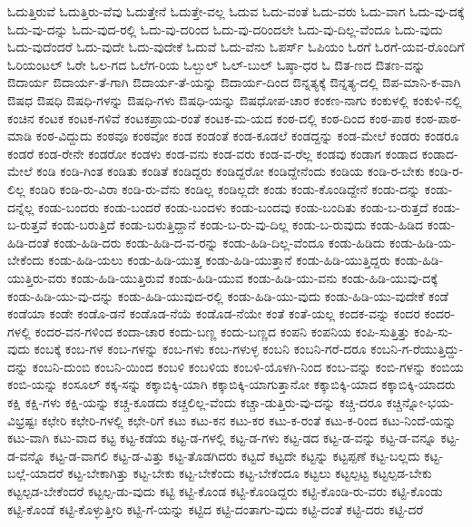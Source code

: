{ಓದುತ್ತಿರುವೆ
ಓದುತ್ತಿರು-ವೆವು
ಓದುತ್ತೇನೆ
ಓದುತ್ತೇ-ವಲ್ಲ
ಓದುವ
ಓದು-ವಂತೆ
ಓದು-ವರು
ಓದು-ವಾಗ
ಓದು-ವು-ದಕ್ಕೆ
ಓದು-ವು-ದನ್ನು
ಓದು-ವುದ-ರಲ್ಲಿ
ಓದು-ವು-ದರಿಂದ
ಓದು-ವು-ದರಿಂದಲೇ
ಓದು-ವು-ದಿಲ್ಲ-ವೆಂದೂ
ಓದು-ವುದು
ಓದು-ವುದೆಂದರೆ
ಓದು-ವುದೇ
ಓದು-ವುದೇಕೆ
ಓದುವೆ
ಓದು-ವೆನು
ಓಪರ್ಸ್
ಓಪಿಯಂ
ಓರಗೆ
ಓರಗೆ-ಯವ-ರೊಂದಿಗೆ
ಓರಿಯಂಟಲ್
ಓರೇ
ಓಲ-ಗದ
ಓಲೆಗ-ರಿಯ
ಓಲ್ಬುಲ್
ಓಲ್-ಬುಲ್
ಓಷ್ಠಾ-ಧರ
ಓ
ಔತ-ಣದ
ಔತಣ-ವನ್ನು
ಔದಾರ್ಯ
ಔದಾರ್ಯ-ತೆ-ಗಾಗಿ
ಔದಾರ್ಯ-ತೆ-ಯನ್ನು
ಔದಾರ್ಯ-ದಿಂದ
ಔನ್ನತ್ಯಕ್ಕೆ
ಔನ್ನತ್ಯ-ದಲ್ಲಿ
ಔಪ-ಮಾನಿ-ಕ-ವಾಗಿ
ಔಷಧ
ಔಷಧಿ
ಔಷಧಿ-ಗಳನ್ನು
ಔಷಧಿ-ಗಳು
ಔಷಧಿ-ಯನ್ನು
ಔಷಧೋಪ-ಚಾರ
ಕಂಕಣ-ನಾಗು
ಕಂಕುಳಲ್ಲಿ
ಕಂಕುಳಿ-ನಲ್ಲಿ
ಕಂಚಿನ
ಕಂಟಕ
ಕಂಟಕ-ಗಳಿವೆ
ಕಂಟಕಪ್ರಾಯ-ರಂತೆ
ಕಂಟಕ-ಮ-ಯದ
ಕಂಠ-ದಲ್ಲಿ
ಕಂಠ-ದಿಂದ
ಕಂಠ-ಪಾಠ
ಕಂಠ-ಪಾಠ-ಮಾಡಿ
ಕಂಠ-ವಿದ್ದುದು
ಕಂಠವೂ
ಕಂಠವೋ
ಕಂಡ
ಕಂಡಂತೆ
ಕಂಡ-ಕೂಡಲೆ
ಕಂಡದ್ದನ್ನು
ಕಂಡ-ಮೇಲೆ
ಕಂಡರು
ಕಂಡರೂ
ಕಂಡರೆ
ಕಂಡ-ರೇನೇ
ಕಂಡರೋ
ಕಂಡಳು
ಕಂಡ-ವನು
ಕಂಡ-ವರು
ಕಂಡ-ವ-ರೆಲ್ಲ
ಕಂಡವು
ಕಂಡಾಗ
ಕಂಡಾದ
ಕಂಡಾದ-ಮೇಲೆ
ಕಂಡಿ
ಕಂಡಿ-ಗಿಂತ
ಕಂಡಿತು
ಕಂಡಿತೆ
ಕಂಡಿದ್ದರು
ಕಂಡಿದ್ದರೋ
ಕಂಡಿದ್ದೇನೆಂದು
ಕಂಡಿಯ
ಕಂಡಿ-ರ-ಬೇಕು
ಕಂಡಿ-ರ-ಲಿಲ್ಲ
ಕಂಡಿರಿ
ಕಂಡಿ-ರು-ವಿರಾ
ಕಂಡಿ-ರು-ವೆನು
ಕಂಡಿಲ್ಲ
ಕಂಡಿಲ್ಲದೇ
ಕಂಡು
ಕಂಡು-ಕೊಂಡಿದ್ದೇನೆ
ಕಂಡು-ದನ್ನು
ಕಂಡು-ದನ್ನೆಲ್ಲ
ಕಂಡು-ಬಂದರು
ಕಂಡು-ಬಂದರೆ
ಕಂಡು-ಬಂದಳು
ಕಂಡು-ಬಂದವು
ಕಂಡು-ಬಂದಿತು
ಕಂಡು-ಬ-ರುತ್ತದೆ
ಕಂಡು-ಬ-ರುತ್ತವೆ
ಕಂಡು-ಬರುತ್ತಿದೆ
ಕಂಡು-ಬರುತ್ತಿದ್ದಾನೆ
ಕಂಡು-ಬ-ರು-ವು-ದಿಲ್ಲ
ಕಂಡು-ಬ-ರುವುದು
ಕಂಡು-ಹಿಡಿದ
ಕಂಡು-ಹಿಡಿ-ದಂತೆ
ಕಂಡು-ಹಿಡಿ-ದರು
ಕಂಡು-ಹಿಡಿ-ದ-ವ-ರನ್ನು
ಕಂಡು-ಹಿಡಿ-ದಿಲ್ಲ-ವೆಂದೂ
ಕಂಡು-ಹಿಡಿದು
ಕಂಡು-ಹಿಡಿ-ಯ-ಬೇಕೆಂದು
ಕಂಡು-ಹಿಡಿ-ಯಲು
ಕಂಡು-ಹಿಡಿ-ಯುತ್ತ
ಕಂಡು-ಹಿಡಿ-ಯುತ್ತಾನೆ
ಕಂಡು-ಹಿಡಿ-ಯುತ್ತಿದ್ದರು
ಕಂಡು-ಹಿಡಿ-ಯುತ್ತಿರು-ವರು
ಕಂಡು-ಹಿಡಿ-ಯುತ್ತಿರುವೆ
ಕಂಡು-ಹಿಡಿ-ಯುವ
ಕಂಡು-ಹಿಡಿ-ಯು-ವನು
ಕಂಡು-ಹಿಡಿ-ಯುವು-ದಕ್ಕೆ
ಕಂಡು-ಹಿಡಿ-ಯು-ವು-ದನ್ನು
ಕಂಡು-ಹಿಡಿ-ಯುವುದ-ರಲ್ಲಿ
ಕಂಡು-ಹಿಡಿ-ಯು-ವುದು
ಕಂಡು-ಹಿಡಿ-ಯು-ವುದೇಕೆ
ಕಂಡೆ
ಕಂಡೆಯಾ
ಕಂಡೇ
ಕಂಡೊ-ಡನೆ
ಕಂಡೊಡ-ನೆಯೆ
ಕಂಡೊಡ-ನೆಯೇ
ಕಂತೆ
ಕಂತೆ-ಯಲ್ಲ
ಕಂದಕ-ವನ್ನು
ಕಂದರ
ಕಂದರ-ಗಳಲ್ಲಿ
ಕಂದರ-ವನ-ಗಳಿಂದ
ಕಂದಾ-ಚಾರ
ಕಂದು-ಬಣ್ಣ
ಕಂದು-ಬಣ್ಣದ
ಕಂಪನಿ
ಕಂಪನಿಯ
ಕಂಪಿ-ಸುತ್ತಿತ್ತು
ಕಂಪಿ-ಸು-ವುದು
ಕಂಬಕ್ಕೆ
ಕಂಬ-ಗಳ
ಕಂಬ-ಗಳನ್ನು
ಕಂಬ-ಗಳು
ಕಂಬ-ಗಳುಳ್ಳ
ಕಂಬನಿ
ಕಂಬನಿ-ಗರೆ-ದರೂ
ಕಂಬನಿ-ಗ-ರೆಯುತ್ತಿದ್ದು-ದನ್ನು
ಕಂಬನಿ-ದುಂಬಿ
ಕಂಬನಿ-ಯಿಂದ
ಕಂಬಳಿ
ಕಂಬಳಿಯ
ಕಂಬಳಿ-ಯೊಳಗಿ-ನಿಂದ
ಕಂಬ-ವನ್ನು
ಕಂಬಿ-ಗಳನ್ನು
ಕಂಬಿಯ
ಕಂಬಿ-ಯನ್ನು
ಕಂಸೂಲ್
ಕಕ್ಕ-ಸನ್ನು
ಕಕ್ಕಾಬಿಕ್ಕಿ-ಯಾಗಿ
ಕಕ್ಕಾಬಿಕ್ಕಿ-ಯಾಗುತ್ತಾನೋ
ಕಕ್ಕಾಬಿಕ್ಕಿ-ಯಾದ
ಕಕ್ಕಾಬಿಕ್ಕಿ-ಯಾದರು
ಕಕ್ಷಿ
ಕಕ್ಷಿ-ಗಳು
ಕಕ್ಷಿ-ಯನ್ನು
ಕಚ್ಚ-ಕೂಡದು
ಕಚ್ಚಲಿಲ್ಲ-ವೆಂದು
ಕಚ್ಚಾ-ಡುತ್ತಿರು-ವು-ದನ್ನು
ಕಚ್ಚಿ-ದರೂ
ಕಚ್ಚಿನ್ನೋ-ಭಯ-ವಿಭ್ರಷ್ಟಃ
ಕಛೇರಿ
ಕಛೇರಿ-ಗಳಲ್ಲಿ
ಕಛೇ-ರಿಗೆ
ಕಟು
ಕಟು-ಕನ
ಕಟು-ಕರ
ಕಟು-ಕ-ರಂತೆ
ಕಟು-ಕ-ರಿಂದ
ಕಟು-ನಿಂದೆ-ಯನ್ನು
ಕಟು-ವಾಗಿ
ಕಟು-ವಾದ
ಕಟ್ಟ
ಕಟ್ಟ-ಕಡೆಯ
ಕಟ್ಟ-ಡ-ಗಳಲ್ಲಿ
ಕಟ್ಟ-ಡ-ಗಳು
ಕಟ್ಟ-ಡದ
ಕಟ್ಟ-ಡ-ವನ್ನು
ಕಟ್ಟ-ಡ-ವನ್ನೂ
ಕಟ್ಟ-ಡ-ವನ್ನೊ
ಕಟ್ಟ-ಡ-ವಾಗಲಿ
ಕಟ್ಟ-ಡ-ವಿತ್ತು
ಕಟ್ಟ-ತೊಡಗಿದರು
ಕಟ್ಟದೆ
ಕಟ್ಟದೇ
ಕಟ್ಟನ್ನು
ಕಟ್ಟಪ್ಪಣೆ
ಕಟ್ಟ-ಬಲ್ಲದು
ಕಟ್ಟ-ಬಲ್ಲೆ-ಯಾದರೆ
ಕಟ್ಟ-ಬೇಕಾಗಿತ್ತು
ಕಟ್ಟ-ಬೇಕು
ಕಟ್ಟ-ಬೇಕೆಂದು
ಕಟ್ಟ-ಬೇಕೆಂದೂ
ಕಟ್ಟಲು
ಕಟ್ಟಲ್ಪಟ್ಟ
ಕಟ್ಟಲ್ಪಡ-ಬೇಕು
ಕಟ್ಟಲ್ಪಡ-ಬೇಕೆಂದರೆ
ಕಟ್ಟಲ್ಪ-ಡು-ವುದು
ಕಟ್ಟಿ
ಕಟ್ಟಿ-ಕೊಂಡ
ಕಟ್ಟಿ-ಕೊಂಡಿದ್ದರು
ಕಟ್ಟಿ-ಕೊಂಡಿ-ರು-ವರು
ಕಟ್ಟಿ-ಕೊಂಡು
ಕಟ್ಟಿ-ಕೊಂಡೆ
ಕಟ್ಟಿ-ಕೊಳ್ಳುತ್ತೀರಿ
ಕಟ್ಟಿ-ಗೆ-ಯನ್ನು
ಕಟ್ಟಿದ
ಕಟ್ಟಿ-ದಂತಾಗು-ವುದು
ಕಟ್ಟಿ-ದಂತೆ
ಕಟ್ಟಿ-ದರು
ಕಟ್ಟಿ-ದರೆ
}
